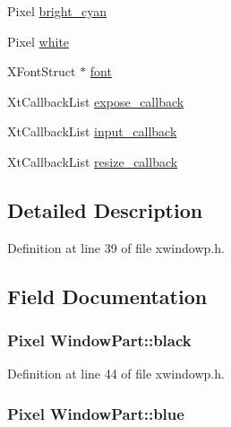 \begin{DoxyCompactItemize}
\item 
Pixel \hyperlink{structWindowPart_ad5ff26f06972c0d1bb38ecc0596b62a1}{bright\+\_\+cyan}
\item 
Pixel \hyperlink{structWindowPart_afb94901758f1adb37e099156d7c490f2}{white}
\item 
X\+Font\+Struct $\ast$ \hyperlink{structWindowPart_ac697050ca10e4b0ab08f5440e35eebd4}{font}
\item 
Xt\+Callback\+List \hyperlink{structWindowPart_afa6864c4003c472a85b2895bf96d9455}{expose\+\_\+callback}
\item 
Xt\+Callback\+List \hyperlink{structWindowPart_a031081e3a85215289cf74575f4ea8cd0}{input\+\_\+callback}
\item 
Xt\+Callback\+List \hyperlink{structWindowPart_a3901f202301b9598dc03caeebab9cab0}{resize\+\_\+callback}
\end{DoxyCompactItemize}


\subsection{Detailed Description}


Definition at line 39 of file xwindowp.\+h.



\subsection{Field Documentation}
\hypertarget{structWindowPart_a8cd1216d558aee91873212dfd1fe8dcb}{
\subsubsection[{black}]{\setlength{\rightskip}{0pt plus 5cm}Pixel Window\+Part\+::black}}\label{structWindowPart_a8cd1216d558aee91873212dfd1fe8dcb}


Definition at line 44 of file xwindowp.\+h.

\hypertarget{structWindowPart_a29cada8a26ea125799f501be4371bdca}{
\subsubsection[{blue}]{\setlength{\rightskip}{0pt plus 5cm}Pixel Window\+Part\+::blue}}\label{structWindowPart_a29cada8a26ea125799f501be4371bdca}


